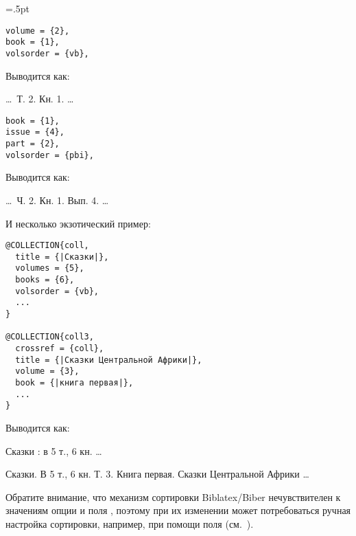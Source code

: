 \documentclass[10pt,a4paper,headings=small,numbers=enddot,english,russian]{ltxdockit}
\newcommand*{\biber}{Biber\xspace}
\newcommand*{\biblatex}{Biblatex\xspace}
\newenvironment{bibexample}{\begin{list}
     {}
     {\setlength{\leftmargin}{\parindent}%
      \setlength{\itemindent}{-\leftmargin}%
      \setlength{\parsep}{0pt}}}
  {\end{list}}
\begin{document}
\bigskip

\columnseprule=.5pt
\raggedcolumns
\begin{multicols}{2}
\begin{lstlisting}[style=bibtex,escapechar=|]
volume = {2},
book = {1},
volsorder = {vb},
\end{lstlisting}
\columnbreak
Выводится как:
\begin{bibexample}
\item \ldots\ Т. 2. Кн. 1. \ldots
\end{bibexample}
\columnbreak
\end{multicols}

\bigskip

\begin{multicols}{2}
\begin{lstlisting}[style=bibtex,escapechar=|]
book = {1},
issue = {4},
part = {2},
volsorder = {pbi},
\end{lstlisting}
\columnbreak
Выводится как:%
\begin{bibexample}
\item \ldots\ Ч. 2. Кн. 1. Вып. 4. \ldots
\end{bibexample}
\columnbreak
\end{multicols}

\bigskip
И несколько экзотический пример:
\bigskip

\begin{multicols}{2}
\begin{lstlisting}[style=bibtex,escapechar=|]
@COLLECTION{coll,
  title = {|Сказки|},
  volumes = {5},
  books = {6},
  volsorder = {vb},
  ...
}

@COLLECTION{coll3,
  crossref = {coll},
  title = {|Сказки Центральной Африки|},
  volume = {3},
  book = {|книга первая|},
  ...
}
\end{lstlisting}
\columnbreak
Выводится как:
\begin{bibexample}
\item Сказки : в 5 т., 6 кн. \ldots
\item Сказки. В 5 т., 6 кн. Т. 3. Книга первая. Сказки Центральной Африки \ldots
\end{bibexample}
\end{multicols}

\bigskip
Обратите внимание, что механизм сортировки \biblatex\unspace\slash\biber
нечувствителен к значениям опции %
и поля , поэтому при их изменении может потребоваться ручная настройка
сортировки, например, при помощи поля  (см.~).
\end{document}
